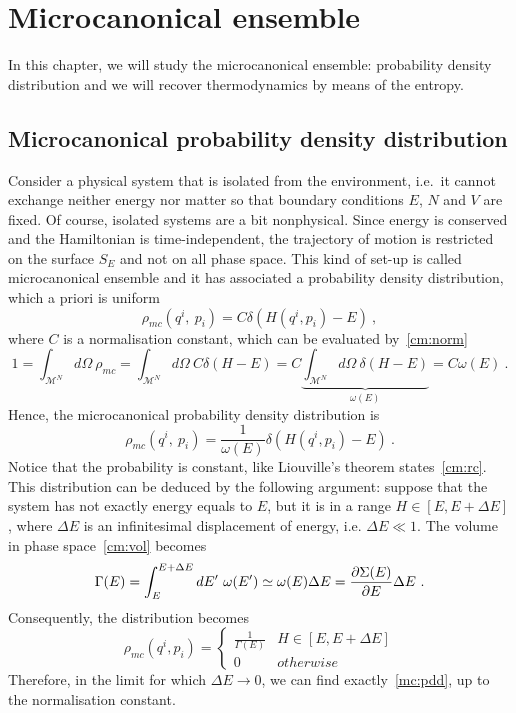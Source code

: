 \chapter{Microcanonical ensemble}

    In this chapter, we will study the microcanonical ensemble: probability density distribution and we will recover thermodynamics by means of the entropy.

\section{Microcanonical probability density distribution}

    Consider a physical system that is isolated from the environment, i.e.~it cannot exchange neither energy nor matter so that boundary conditions $E$, $N$ and $V$ are fixed. Of course, isolated systems are a bit nonphysical. Since energy is conserved and the Hamiltonian is time-independent, the trajectory of motion is restricted on the surface $S_E$ and not on all phase space. This kind of set-up is called microcanonical ensemble and it has associated a probability density distribution, which a priori is uniform
    \begin{equation*}
        \rho_{mc}(q^i, ~p_i) = C \delta (H(q^i, p_i) - E) ~,
    \end{equation*}
    where $C$ is a normalisation constant, which can be evaluated by~\eqref{cm:norm}
    \begin{equation*}
        1 = \int_{\mathcal M^N} d\Omega ~ \rho_{mc} = \int_{\mathcal M^N} d\Omega ~ C \delta(H - E) = C \underbrace{\int_{\mathcal M^N} d\Omega ~ \delta(H - E)}_{\omega(E)} = C \omega(E) ~.
    \end{equation*}
    Hence, the microcanonical probability density distribution is
    \begin{equation}\label{mc:pdd}
        \rho_{mc}(q^i, ~p_i) = \frac{1}{\omega(E)} \delta (H(q^i, p_i) - E) ~.
    \end{equation}
    Notice that the probability is constant, like Liouville's theorem states~\eqref{cm:rc}. This distribution can be deduced by the following argument: suppose that the system has not exactly energy equals to $E$, but it is in a range $H \in [E, E + \Delta E]$, where $\Delta E$ is an infinitesimal displacement of energy, i.e. $\Delta E \ll 1$. The volume in phase space~\eqref{cm:vol} becomes 
    \begin{equation*}
        \Gamma (E) = \int_{E}^{E+\Delta E}dE'~ \omega(E') \simeq \omega(E) \Delta E = \frac{\partial\Sigma(E)}{\partial E} \Delta E ~.
    \end{equation*}
    Consequently, the distribution becomes 
    \begin{equation*}
        \rho_{mc}(q^i, p_i) = \begin{cases}
            \frac{1}{\Gamma(E)} & H \in [E, E + \Delta E] \\
            0 & otherwise
        \end{cases}
    \end{equation*}
    Therefore, in the limit for which $\Delta E \rightarrow 0$, we can find exactly~\eqref{mc:pdd}, up to the normalisation constant.

